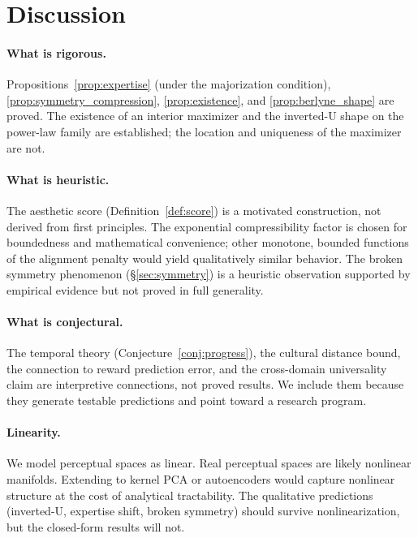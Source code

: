 \documentclass[journal]{IEEEtran}
\theoremstyle{definition}
\theoremstyle{remark}
\begin{document}
\section{Discussion}
\label{sec:discussion}

\paragraph{What is rigorous.}
Propositions~\ref{prop:expertise} (under the majorization condition),
\ref{prop:symmetry_compression}, \ref{prop:existence}, and
\ref{prop:berlyne_shape} are proved.  The existence of an interior
maximizer and the inverted-U shape on the power-law family are
established; the location and uniqueness of the maximizer are not.

\paragraph{What is heuristic.}
The aesthetic score (Definition~\ref{def:score}) is a motivated
construction, not derived from first principles.  The exponential
compressibility factor is chosen for boundedness and mathematical
convenience; other monotone, bounded functions of the alignment
penalty would yield qualitatively similar behavior.  The broken
symmetry phenomenon (\S\ref{sec:symmetry}) is a heuristic
observation supported by empirical evidence but not proved in
full generality.

\paragraph{What is conjectural.}
The temporal theory (Conjecture~\ref{conj:progress}), the cultural
distance bound, the connection to reward prediction error, and the
cross-domain universality claim are interpretive connections, not
proved results.  We include them because they generate testable
predictions and point toward a research program.

\paragraph{Linearity.}
We model perceptual spaces as linear.  Real perceptual spaces are
likely nonlinear manifolds.  Extending to kernel PCA or
autoencoders would capture nonlinear structure at the cost of
analytical tractability.  The qualitative predictions
(inverted-U, expertise shift, broken symmetry) should survive
nonlinearization, but the closed-form results will not.
\end{document}
